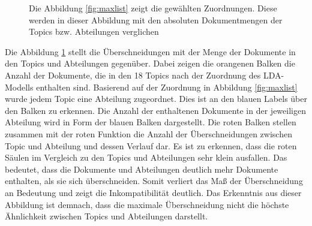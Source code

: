 \documentclass[german,version-2020-11]{uzl-thesis}
\begin{document}
\begin{figure}[H]
\begin{center}

\end{center}
\caption{Die Abbildung \ref{fig:maxlist} zeigt die gewählten Zuordnungen. Diese werden in dieser Abbildung mit den absoluten Dokumentmengen der Topics bzw. Abteilungen verglichen}
\label{fig:comp}
\end{figure}

Die Abbildung \ref{fig:comp} stellt die Überschneidungen mit der Menge der Dokumente in den Topics und Abteilungen gegenüber. Dabei zeigen die orangenen Balken die Anzahl der Dokumente, die in den 18 Topics nach der Zuordnung des LDA-Modells enthalten sind. Basierend auf der Zuordnung in Abbildung \ref{fig:maxlist} wurde jedem Topic eine Abteilung zugeordnet. Dies ist an den blauen Labels über den Balken zu erkennen. Die Anzahl der enthaltenen Dokumente in der jeweiligen Abteilung wird in Form der blauen Balken dargestellt. Die roten Balken stellen zusammen mit der roten Funktion die Anzahl der Überschneidungen zwischen Topic und Abteilung und dessen Verlauf dar. Es ist zu erkennen, dass die roten Säulen im Vergleich zu den Topics und Abteilungen sehr klein ausfallen. Das bedeutet, dass die Dokumente und Abteilungen deutlich mehr Dokumente enthalten, als sie sich überschneiden. Somit verliert das Maß der Überschneidung an Bedeutung und zeigt die Inkompatibilität deutlich. Das Erkenntnis aus dieser Abbildung ist demnach, dass die maximale Überschneidung nicht die höchste Ähnlichkeit zwischen Topics und Abteilungen darstellt. \\
\end{document}
